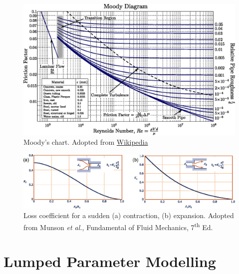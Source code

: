 \documentclass[a4paper]{article}
\begin{document}
\begin{landscape}
\begin{figure}
    \centering
    \includegraphics[scale=.8]{img/Moody_EN.eps}
    \caption{Moody's chart. Adopted from \href{https://en.m.wikipedia.org/wiki/File:Moody_EN.svg}{Wikipedia}}
    \label{fig:moody}
\end{figure}

\begin{figure}[H]
    \centering
    \includegraphics{img/contraction_expansion_loss.eps}
    \caption{Loss coefficient for a sudden (a) contraction, (b) expansion. Adopted from Munson \textit{et al.}, Fundamental of Fluid Mechanics, 7\textsuperscript{th} Ed.}
    \label{fig:contraction-expansion-losses}
\end{figure}
\end{landscape}


\section{Lumped Parameter Modelling}
\end{document}
